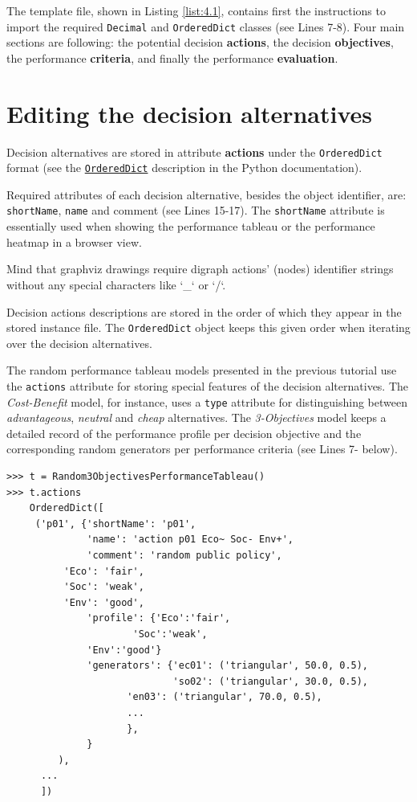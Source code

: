 The template file, shown in Listing \ref{list:4.1}, contains first the instructions to import the required {\tt Decimal} and {\tt OrderedDict} classes (see Lines 7-8). Four main sections are following: the potential decision {\bf actions}, the decision \textbf{objectives}, the performance \textbf{criteria}, and finally the performance \textbf{evaluation}.  

\section{Editing the decision alternatives}
\label{sec:4.2}

Decision alternatives are stored in attribute \textbf{actions} under the \texttt{OrderedDict} format (see the \href{https://docs.python.org/3/library/collections.html}{{\tt OrderedDict}} description in the Python documentation).

Required attributes of each decision alternative, besides the object identifier,  are: \texttt{shortName}, \texttt{name} and \texttt{}comment (see Lines 15-17). The \texttt{shortName} attribute is essentially used when showing the performance tableau or the performance heatmap in a browser view.

\begin{svgraybox}Mind that graphviz drawings require digraph actions' (nodes) identifier strings without any special characters like `\_` or `/`.\end{svgraybox}

Decision actions descriptions are stored in the order of which they appear in the stored instance file. The \texttt{OrderedDict} object keeps this given order when iterating over the decision alternatives.

The random performance tableau models presented in the previous tutorial use the \texttt{actions} attribute for storing special features of the decision alternatives. The \emph{Cost-Benefit} model, for instance, uses a \texttt{type} attribute for distinguishing between \emph{advantageous}, \emph{neutral} and \emph{cheap} alternatives. The \emph{3-Objectives} model keeps a detailed record of the performance profile per decision objective and the corresponding random generators per performance criteria (see Lines 7- below).

\begin{lstlisting}[basicstyle=\footnotesize]
>>> t = Random3ObjectivesPerformanceTableau()
>>> t.actions
    OrderedDict([
     ('p01', {'shortName': 'p01',
              'name': 'action p01 Eco~ Soc- Env+',
              'comment': 'random public policy',
	      'Eco': 'fair',
	      'Soc': 'weak',
	      'Env': 'good',
              'profile': {'Eco':'fair',
	                  'Soc':'weak',
			  'Env':'good'}
              'generators': {'ec01': ('triangular', 50.0, 0.5),
                             'so02': ('triangular', 30.0, 0.5),
		             'en03': ('triangular', 70.0, 0.5),
		             ...
		             },
              }
         ),
      ...
      ])
\end{lstlisting}

